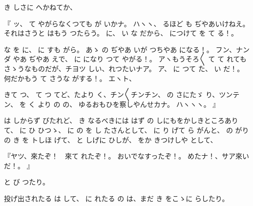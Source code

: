 き
しさに
へかねてか、

『
ッ、
て
やがらなくつても
が
いかナ。
ハヽヽ、
るほど
も
ぢやあいけねえ。
それはさうと
はもう
つたらう。
に、
い
な
だから、
につけて
を
て
る！。

な
を
に、
に
すも
がら。
あゝ
の
ぢやあ
いが
つちやあ
になる！。
フン、ナンダ
やあ
ぢやあ
えで、
に
になり
つて
やがる！。
アヽもうそろ〳〵
て
て
れても
さゝうなものだが、チヨツ
しい、れつたいナア。
ア、
に
つて
た、
い
だ！。
何だかもう
て
さうな
がする！。
エヽト、

きて
つ、
て
つ
てど、たより
く、チン〳〵チンチン、
の
さにたゞ
り、ツンテン、
を
く
より
の
の、
ゆるおもひを察しやんせカナ。
ハヽヽヽ。
』

は
しからず
びたれど、
き
なるべきには
はず
の
しにもをかしきところありて、
に
ひ
ひつゝ、
に
の
を
し
たさんとして、
に
り
げて
ら
がんと、
の
がりの
き
を
トしほ
げて、
と
しげに
ひしが、
をか
きつけしや
として、

『ヤツ、來たぞ！　來て
れたぞ！。
おいでなすったぞ！。
めたナ！、サア來いだ！。
』

と
び
つたり。

投げ出されたる
は
して、
に
れたる
の
は、まだ
き
をこゝに
らしたり。

